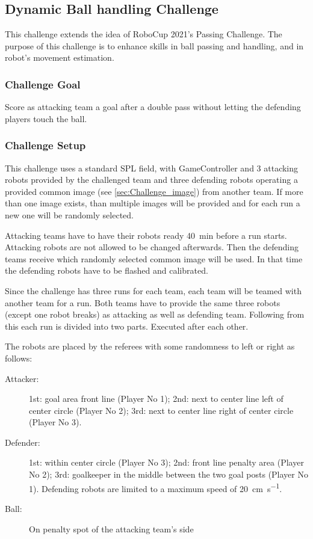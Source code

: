 \newpage

\subsection{Dynamic Ball handling Challenge}

    This challenge extends the idea of RoboCup 2021's Passing Challenge. The purpose of this challenge is to enhance skills in ball passing and handling, and in robot's movement estimation.

    \subsubsection{Challenge Goal}

        Score as attacking team a goal after a double pass without letting the defending players touch the ball.

    \subsubsection{Challenge Setup}

        This challenge uses a standard SPL field, with GameController and 3 attacking robots provided by the challenged team and three defending robots operating a provided common image (see \cref{sec:Challenge_image}) from another team. If more than one image exists, than multiple images will be provided and for each run a new one will be randomly selected.

        Attacking teams have to have their robots ready \qty{40}{\minute} before a run starts. Attacking robots are not allowed to be changed afterwards. Then the defending teams receive which randomly selected common image will be used. In that time the defending robots have to be flashed and calibrated.

        Since the challenge has three runs for each team, each team will be teamed with another team for a run. Both teams have to provide the same three robots (except one robot breaks) as attacking as well as defending team. Following from this each run is divided into two parts. Executed after each other.

        The robots are placed by the referees with some randomness to left or right as follows:

        \begin{description}
            \item[Attacker:] 1st: goal area front line (Player No 1); 2nd: next to center line left of center circle (Player No 2); 3rd: next to center line right of center circle (Player No 3).
            \item[Defender:] 1st: within center circle (Player No 3); 2nd: front line penalty area (Player No 2); 3rd: goalkeeper in the middle between the two goal posts (Player No 1). Defending robots are limited to a maximum speed of \qty{20}{\cm \per \second}.
            \item[Ball:] On penalty spot of the attacking team's side
        \end{description}

